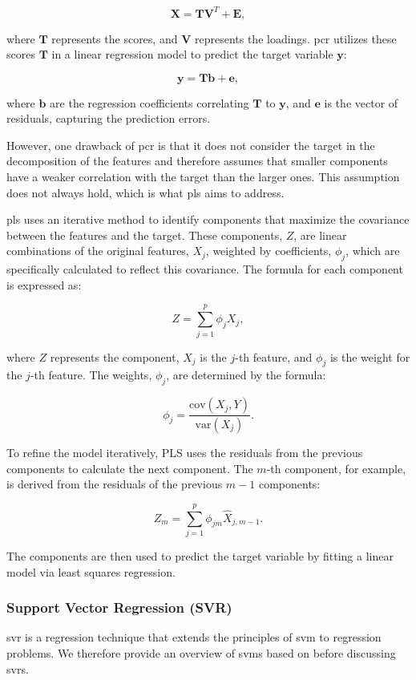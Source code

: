 $$
\mathbf{X} = \mathbf{TV}^T + \mathbf{E},
$$

where $\mathbf{T}$ represents the scores, and $\mathbf{V}$ represents the loadings.
\gls{pcr} utilizes these scores $\mathbf{T}$ in a linear regression model to predict the target variable $\mathbf{y}$:

$$
\mathbf{y} = \mathbf{Tb} + \mathbf{e},
$$

where $\mathbf{b}$ are the regression coefficients correlating $\mathbf{T}$ to $\mathbf{y}$, and $\mathbf{e}$ is the vector of residuals, capturing the prediction errors.

However, one drawback of \gls{pcr} is that it does not consider the target in the decomposition of the features and therefore assumes that smaller components have a weaker correlation with the target than the larger ones.
This assumption does not always hold, which is what \gls{pls} aims to address.

\gls{pls} uses an iterative method to identify components that maximize the covariance between the features and the target.
These components, $Z$, are linear combinations of the original features, $X_j$, weighted by coefficients, $\phi_j$, which are specifically calculated to reflect this covariance.
The formula for each component is expressed as:

$$
    Z = \sum_{j=1}^{p} \phi_j X_j,
$$

where $Z$ represents the component, $X_j$ is the $j$-th feature, and $\phi_j$ is the weight for the $j$-th feature.
The weights, $\phi_j$, are determined by the formula:

$$
    \phi_j = \frac{\text{cov}(X_j, Y)}{\text{var}(X_j)}.
$$

To refine the model iteratively, PLS uses the residuals from the previous components to calculate the next component.
The $m$-th component, for example, is derived from the residuals of the previous $m-1$ components:

$$
    Z_m = \sum_{j=1}^{p} \phi_{jm} \hat{X}_{j, m-1}.
$$

The components are then used to predict the target variable by fitting a linear model via least squares regression.

\subsubsection{Support Vector Regression (SVR)}
\gls{svr} is a regression technique that extends the principles of \gls{svm} to regression problems.
We therefore provide an overview of \gls{svm}s based on \citet{James2023AnIS} before discussing \gls{svr}s.

